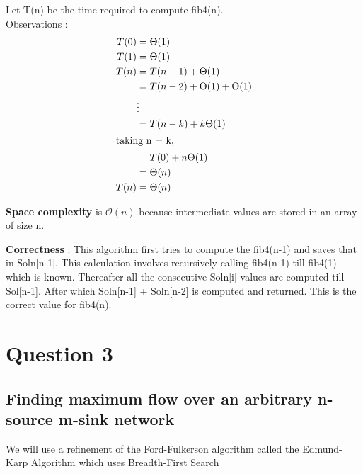 \documentclass{article}
\begin{document}
Let T(n) be the time required to compute fib4(n). \\
Observations : \\
\begin{align*}
T(0) & = \Theta(1) \\
T(1) & = \Theta(1) \\
T(n) & = T(n-1) + \Theta(1) \\
& = T(n-2) + \Theta(1) + \Theta(1) \\
& \vdots \\
& = T(n-k) + k\Theta(1) \\
\intertext{taking n = k,}
& = T(0) + n\Theta(1) \\
& = \Theta(n) \\
T(n) & = \Theta(n)\\
\end{align*}

\textbf{Space complexity} is $\mathcal{O}(n)$ because intermediate values are stored in an array of size n.

\textbf{Correctness} : This algorithm first tries to compute the fib4(n-1) and saves that in Soln[n-1]. This calculation involves recursively calling fib4(n-1) till fib4(1) which is known. Thereafter all the consecutive Soln[i] values are computed till Sol[n-1]. After which Soln[n-1] + Soln[n-2] is computed and returned. This is the correct value for fib4(n).

\newpage
\section{Question 3}
\subsection{Finding maximum flow over an arbitrary n-source m-sink network}
We will use a refinement of the Ford-Fulkerson algorithm called the Edmund-Karp Algorithm which uses Breadth-First Search
\end{document}
